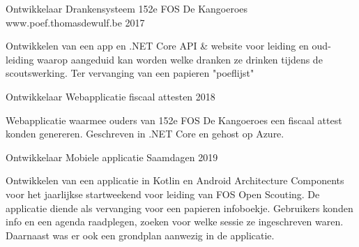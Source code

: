 


\begin{cventries}


\cventry
{Ontwikkelaar} %
{Drankensysteem 152e FOS De Kangoeroes} %
{www.poef.thomasdewulf.be} %
{2017} %
{ 
\begin{cvitems}
\item {Ontwikkelen van een app en .NET Core API \& website voor leiding en oud-leiding waarop aangeduid kan worden welke dranken ze drinken tijdens de scoutswerking. Ter vervanging van een papieren "poeflijst"}
\end{cvitems}
}

\cventry
{Ontwikkelaar} %
{Webapplicatie fiscaal attesten} %
{}
{2018} %
{ 
\begin{cvitems}
\item {Webapplicatie waarmee ouders van 152e FOS De Kangoeroes een fiscaal attest konden genereren. Geschreven in .NET Core en gehost op Azure.}
\end{cvitems}
}

\cventry
{Ontwikkelaar} %
{Mobiele applicatie Saamdagen} %
{}
{2019} %
{ 
\begin{cvitems}
\item {Ontwikkelen van een applicatie in Kotlin en Android Architecture Components voor het jaarlijkse startweekend voor leiding van FOS Open Scouting. De applicatie diende als vervanging voor een papieren infoboekje. Gebruikers konden info en een agenda raadplegen, zoeken voor welke sessie ze ingeschreven waren. Daarnaast was er ook een grondplan aanwezig in de applicatie.}
\end{cvitems}
}

\end{cventries}